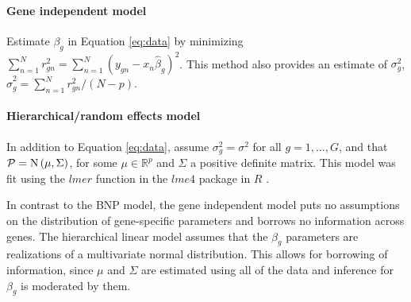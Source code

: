{\paragraph{Gene independent model}
Estimate $\beta_g$ in Equation \ref{eq:data} by minimizing $\sum_{n=1}^N r_{gn}^2 = \sum_{n=1}^N\left(y_{gn}-x_n\hat{\beta}_g\right)^2$. This method also provides an estimate of $\sigma_g^2$, $\hat{\sigma}^2_g = \sum_{n=1}^N r_{gn}^2/(N-p)$.

\paragraph{Hierarchical/random effects model}
In addition to Equation \ref{eq:data}, assume $\sigma^2_g = \sigma^2$ for all $g=1,\ldots,G$, and that $\mathcal{P} = \operatorname{N}\left(\mu, \Sigma \right)$, for some $\mu \in \mathbb{R}^p$ and $\Sigma$ a positive definite matrix. This model was fit using the $lmer$ function in the $lme4$ package in $R$ \citep{lme4,r}.

In contrast to the BNP model, the gene independent model puts no assumptions on the distribution of gene-specific parameters and borrows no information across genes. The hierarchical linear model assumes that the $\beta_g$ parameters are realizations of a multivariate normal distribution. This allows for borrowing of information, since $\mu$ and $\Sigma$ are estimated using all of the data and inference for $\beta_g$ is moderated by them.

}
